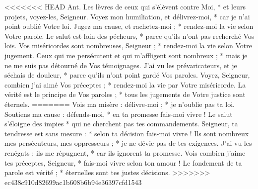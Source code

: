 <<<<<<< HEAD
Ant. Les lèvres de ceux qui s’élèvent contre Moi, * et leurs projets, voyez-les, Seigneur.
\versseparator
Voyez mon humiliation, et délivrez-moi, * car je n'ai point oublié Votre loi.
\versseparator
Jugez ma cause, et rachetez-moi ; * rendez-moi la vie selon Votre parole.
\versseparator
Le salut est loin des pécheurs, * parce qu'ils n'ont pas recherché Vos lois.
\versseparator
Vos miséricordes sont nombreuses, Seigneur ; * rendez-moi la vie selon Votre jugement.
\versseparator
Ceux qui me persécutent et qui m'affligent sont nombreux ; * mais je ne me suis pas détourné de Vos témoignages.
\versseparator
J'ai vu les prévaricateurs, et je séchais de douleur, * parce qu'ils n'ont point gardé Vos paroles.
\versseparator
Voyez, Seigneur, combien j'ai aimé Vos préceptes ; * rendez-moi la vie par Votre miséricorde.
\versseparator
La vérité est le principe de Vos paroles ; * tous les jugements de Votre justice sont éternels.
=======
Vois ma misère : délivre-moi ; *
je n’oublie pas ta loi.
\versseparator
Soutiens ma cause : défends-moi, *
en ta promesse fais-moi vivre !
\versseparator
Le salut s’éloigne des impies *
qui ne cherchent pas tes commandements.
\versseparator
Seigneur, ta tendresse est sans mesure : *
selon ta décision fais-moi vivre !
\versseparator
Ils sont nombreux mes persécuteurs, mes oppresseurs ; *
je ne dévie pas de tes exigences.
\versseparator
J’ai vu les renégats : ils me répugnent, *
car ils ignorent ta promesse.
\versseparator
Vois combien j’aime tes préceptes, Seigneur, *
fais-moi vivre selon ton amour !
\versseparator
Le fondement de ta parole est vérité ; *
éternelles sont tes justes décisions.
>>>>>>> ec438c910d82699ac1b608b6b94e36397cfd1543
